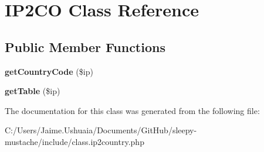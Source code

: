 \hypertarget{class_i_p2_c_o}{\section{I\-P2\-C\-O Class Reference}
\label{class_i_p2_c_o}
}
\subsection*{Public Member Functions}
\begin{DoxyCompactItemize}
\item 
\hypertarget{class_i_p2_c_o_a0aef1ce60812280445e63410f68f00a0}{{\bfseries get\-Country\-Code} (\$ip)}\label{class_i_p2_c_o_a0aef1ce60812280445e63410f68f00a0}

\item 
\hypertarget{class_i_p2_c_o_a827810b3e6446a9dd09e79a0d03f040d}{{\bfseries get\-Table} (\$ip)}\label{class_i_p2_c_o_a827810b3e6446a9dd09e79a0d03f040d}

\end{DoxyCompactItemize}


The documentation for this class was generated from the following file\-:\begin{DoxyCompactItemize}
\item 
C\-:/\-Users/\-Jaime.\-Ushuaia/\-Documents/\-Git\-Hub/sleepy-\/mustache/include/class.\-ip2country.\-php\end{DoxyCompactItemize}
